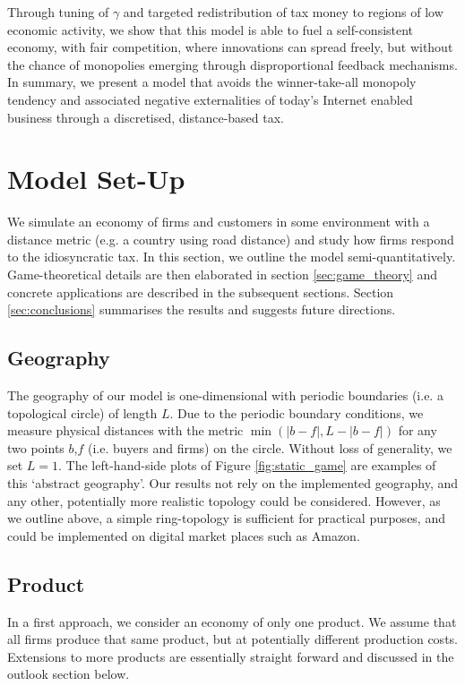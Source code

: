 \documentclass[final,3p,times,authoryear,12pt]{elsarticle}
\begin{document}
Through tuning of $\gamma$ and targeted redistribution of tax money to regions of low economic activity, we show that this model is able to fuel a self-consistent economy, 
with fair competition, where innovations can spread freely, but without the chance of monopolies emerging through disproportional feedback mechanisms. 
In summary, we present a model that avoids the winner-take-all monopoly tendency and associated negative externalities of today's Internet enabled business through a discretised, distance-based tax. 

\section{Model Set-Up}

We simulate an economy of firms and customers in some environment with a distance metric (e.g. a country using road distance) and study how firms respond to the idiosyncratic tax.
In this section, we outline the model semi-quantitatively. 
Game-theoretical details are then elaborated in section \ref{sec:game_theory} and concrete applications are described in the subsequent sections. 
Section \ref{sec:conclusions} summarises the results and suggests future directions. 

\subsection{Geography}
The geography of our model is one-dimensional with periodic boundaries (i.e. a topological circle) of length $L$. 
Due to the periodic boundary conditions, we measure physical distances with the metric $\min(|b-f|, L-|b-f|)$ for any two points $b$,$f$ (i.e. buyers and firms) on the circle. 
Without loss of generality, we set $L=1$. 
The left-hand-side plots of Figure \ref{fig:static_game} are examples of this `abstract geography'.
Our results not rely on the implemented geography, and any other, potentially more realistic topology could be considered.
However, as we outline above, a simple ring-topology is sufficient for practical purposes, and could be implemented on digital market places such as Amazon. 

\subsection{Product}
In a first approach, we consider an economy of only one product. 
We assume that all firms produce that same product, but at potentially different production costs. 
Extensions to more products are essentially straight forward and discussed in the outlook section below. 
\end{document}
